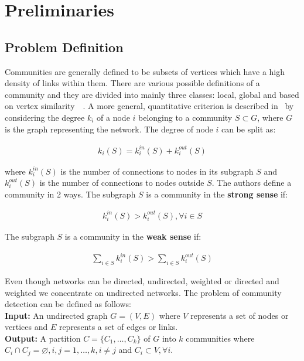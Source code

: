 \chapter{Preliminaries}
\begin{spacing}{1.5}
\thispagestyle{empty}
\section{Problem Definition}
Communities are generally defined to be subsets of vertices which have a high density of links within them. There are various possible definitions of a community and they are divided into mainly three classes: local, global and based on vertex similarity~\cite{Fortunato201075}~\cite{Wasserman-Social-1994}. A more general, quantitative criterion is described in~\cite{Radicchi02032004} by considering the degree $k_i$ of a node $i$ belonging to a community $S \subset G$, where $G$ is the graph representing the network. The degree of node $i$ can be split as:

\begin{align}
k_i(S) = k_i^{in}(S) + k_i^{out}(S)
\end{align}

where $k_i^{in}(S)$ is the number of connections to nodes in its subgraph $S$ and $k_i^{out}(S)$ is the number of connections to nodes outside $S$. The authors define a community in 2 ways. The subgraph $S$ is a community in the \textbf{strong sense} if:

\begin{align}
k_i^{in}(S) > k_i^{out}(S), \forall i \in S
\end{align}

\newpage
The subgraph $S$ is a community in the \textbf{weak sense} if:

\begin{align}
\displaystyle\sum_{i \in S} k_i^{in}(S) > \displaystyle\sum_{i \in S} k_i^{out}(S)
\end{align}

Even though networks can be directed, undirected, weighted or directed and weighted we concentrate on undirected networks. The problem of community detection can be defined as follows:\\

\noindent \textbf{Input: }An undirected graph $G = (V, E)$ where $V$ represents a set of nodes or vertices and $E$ represents a set of edges or links. \\
\noindent \textbf{Output: }A partition $C = \{C_1, \ldots, C_k\}$ of $G$ into $k$ communities where $C_i \cap C_j = \varnothing, i, j = {1, \ldots, k}, i \neq j$ and $C_i \subset V,  \forall i$.


\end{spacing}
